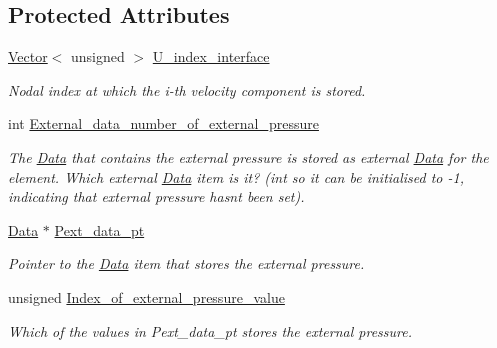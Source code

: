 \subsection*{Protected Attributes}
\begin{DoxyCompactItemize}
\item 
\hyperlink{classoomph_1_1Vector}{Vector}$<$ unsigned $>$ \hyperlink{classoomph_1_1FluidInterfaceElement_a6a818d9999c68641223edcad217a8c3f}{U\+\_\+index\+\_\+interface}
\begin{DoxyCompactList}\small\item\em Nodal index at which the i-\/th velocity component is stored. \end{DoxyCompactList}\item 
int \hyperlink{classoomph_1_1FluidInterfaceElement_a2d4c5b3e08177f5695fa9e76bf08b570}{External\+\_\+data\+\_\+number\+\_\+of\+\_\+external\+\_\+pressure}
\begin{DoxyCompactList}\small\item\em The \hyperlink{classoomph_1_1Data}{Data} that contains the external pressure is stored as external \hyperlink{classoomph_1_1Data}{Data} for the element. Which external \hyperlink{classoomph_1_1Data}{Data} item is it? (int so it can be initialised to -\/1, indicating that external pressure hasn\textquotesingle{}t been set). \end{DoxyCompactList}\item 
\hyperlink{classoomph_1_1Data}{Data} $\ast$ \hyperlink{classoomph_1_1FluidInterfaceElement_a9177eb6e96e5ac13fe092596bc104910}{Pext\+\_\+data\+\_\+pt}
\begin{DoxyCompactList}\small\item\em Pointer to the \hyperlink{classoomph_1_1Data}{Data} item that stores the external pressure. \end{DoxyCompactList}\item 
unsigned \hyperlink{classoomph_1_1FluidInterfaceElement_a2a49c97d42ce05d1876626e5918bb8eb}{Index\+\_\+of\+\_\+external\+\_\+pressure\+\_\+value}
\begin{DoxyCompactList}\small\item\em Which of the values in Pext\+\_\+data\+\_\+pt stores the external pressure. \end{DoxyCompactList}\end{DoxyCompactItemize}
